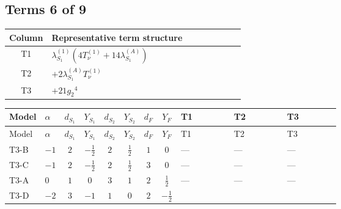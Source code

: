 \documentclass[8pt]{article}
\begin{document}
\begin{landscape}
\subsection*{Terms 6 of 9}
\begin{center}
\begin{tabular}{@{}c >{\raggedright\arraybackslash}p{0.82\linewidth}@{}}
\toprule
Column & Representative term structure \\
\midrule
T1 & \(\displaystyle {\lambda_{S_1}^{(1)}} (4 T_{\nu}^{(1)}+14 {\lambda_{S_1}^{(A)}})\) \\
\midrule
T2 & \(\displaystyle +2 {\lambda_{S_1}^{(A)}} T_{\nu}^{(1)}\) \\
\midrule
T3 & \(\displaystyle +21 {g_2}^4\) \\
\midrule
\bottomrule
\end{tabular}
\end{center}
\smallskip
\tiny
\begin{longtable}{@{}llcccccc >{\raggedright\arraybackslash}p{0.21\linewidth} >{\raggedright\arraybackslash}p{0.21\linewidth} >{\raggedright\arraybackslash}p{0.21\linewidth}@{}}
\toprule
Model & $\alpha$ & $d_{S_1}$ & $Y_{S_1}$ & $d_{S_2}$ & $Y_{S_2}$ & $d_F$ & $Y_F$ & T1 & T2 & T3 \\
\midrule
\endfirsthead
\toprule
Model & $\alpha$ & $d_{S_1}$ & $Y_{S_1}$ & $d_{S_2}$ & $Y_{S_2}$ & $d_F$ & $Y_F$ & T1 & T2 & T3 \\
\midrule
\endhead
T3-B & $-1$ & $2$ & $-\frac{1}{2}$ & $2$ & $\frac{1}{2}$ & $1$ & $0$ & --- & --- & --- \\
\midrule
T3-C & $-1$ & $2$ & $-\frac{1}{2}$ & $2$ & $\frac{1}{2}$ & $3$ & $0$ & --- & --- & --- \\
\midrule
T3-A & $0$ & $1$ & $0$ & $3$ & $1$ & $2$ & $\frac{1}{2}$ & --- & --- & --- \\
\midrule
T3-D & $-2$ & $3$ & $-1$ & $1$ & $0$ & $2$ & $-\frac{1}{2}$ & \scriptsize\adjustbox{max width=\linewidth}{$\begin{gathered} {\lambda_{S_1}^{(1)}} (4 T_{\nu}^{(1)}+14 {\lambda_{S_1}^{(A)}})\end{gathered}$} & \scriptsize\adjustbox{max width=\linewidth}{$\begin{gathered} +2 {\lambda_{S_1}^{(A)}} T_{\nu}^{(1)}\end{gathered}$} & \scriptsize\adjustbox{max width=\linewidth}{$\begin{gathered} +21 {g_2}^4\end{gathered}$} \\
\midrule

\end{longtable}
\end{landscape}
\end{document}
